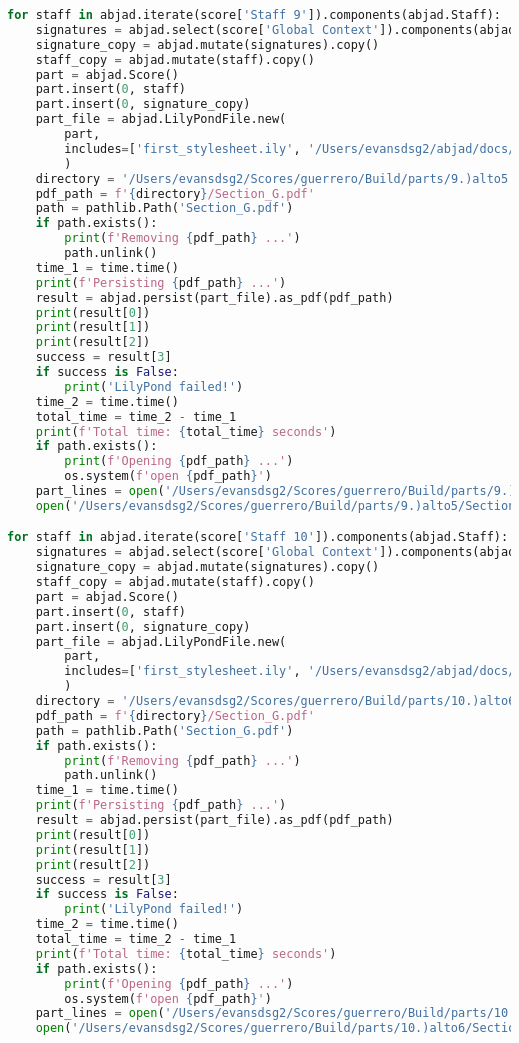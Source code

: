 \begin{lstlisting}[language=Python, caption=Invocation Source Code]
for staff in abjad.iterate(score['Staff 9']).components(abjad.Staff):
    signatures = abjad.select(score['Global Context']).components(abjad.Staff)
    signature_copy = abjad.mutate(signatures).copy()
    staff_copy = abjad.mutate(staff).copy()
    part = abjad.Score()
    part.insert(0, staff)
    part.insert(0, signature_copy)
    part_file = abjad.LilyPondFile.new(
        part,
        includes=['first_stylesheet.ily', '/Users/evansdsg2/abjad/docs/source/_stylesheets/abjad.ily'],
        )
    directory = '/Users/evansdsg2/Scores/guerrero/Build/parts/9.)alto5'
    pdf_path = f'{directory}/Section_G.pdf'
    path = pathlib.Path('Section_G.pdf')
    if path.exists():
        print(f'Removing {pdf_path} ...')
        path.unlink()
    time_1 = time.time()
    print(f'Persisting {pdf_path} ...')
    result = abjad.persist(part_file).as_pdf(pdf_path)
    print(result[0])
    print(result[1])
    print(result[2])
    success = result[3]
    if success is False:
        print('LilyPond failed!')
    time_2 = time.time()
    total_time = time_2 - time_1
    print(f'Total time: {total_time} seconds')
    if path.exists():
        print(f'Opening {pdf_path} ...')
        os.system(f'open {pdf_path}')
    part_lines = open('/Users/evansdsg2/Scores/guerrero/Build/parts/9.)alto5/Section_G.ly').readlines()
    open('/Users/evansdsg2/Scores/guerrero/Build/parts/9.)alto5/Section_G.ly', 'w').writelines(part_lines[15:-1])

for staff in abjad.iterate(score['Staff 10']).components(abjad.Staff):
    signatures = abjad.select(score['Global Context']).components(abjad.Staff)
    signature_copy = abjad.mutate(signatures).copy()
    staff_copy = abjad.mutate(staff).copy()
    part = abjad.Score()
    part.insert(0, staff)
    part.insert(0, signature_copy)
    part_file = abjad.LilyPondFile.new(
        part,
        includes=['first_stylesheet.ily', '/Users/evansdsg2/abjad/docs/source/_stylesheets/abjad.ily'],
        )
    directory = '/Users/evansdsg2/Scores/guerrero/Build/parts/10.)alto6'
    pdf_path = f'{directory}/Section_G.pdf'
    path = pathlib.Path('Section_G.pdf')
    if path.exists():
        print(f'Removing {pdf_path} ...')
        path.unlink()
    time_1 = time.time()
    print(f'Persisting {pdf_path} ...')
    result = abjad.persist(part_file).as_pdf(pdf_path)
    print(result[0])
    print(result[1])
    print(result[2])
    success = result[3]
    if success is False:
        print('LilyPond failed!')
    time_2 = time.time()
    total_time = time_2 - time_1
    print(f'Total time: {total_time} seconds')
    if path.exists():
        print(f'Opening {pdf_path} ...')
        os.system(f'open {pdf_path}')
    part_lines = open('/Users/evansdsg2/Scores/guerrero/Build/parts/10.)alto6/Section_G.ly').readlines()
    open('/Users/evansdsg2/Scores/guerrero/Build/parts/10.)alto6/Section_G.ly', 'w').writelines(part_lines[15:-1])


\end{lstlisting}

